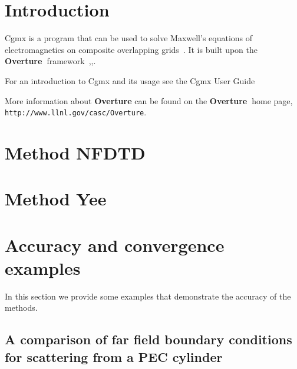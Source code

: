 \documentclass{article}
\newcommand{\Overture}{{\bf Overture\ }}
\begin{document}
\clearpage
\tableofcontents


\vfill\eject

\section{Introduction}

   Cgmx is a program that can be used to solve Maxwell's equations of electromagnetics 
on composite overlapping grids~\cite{max2006b}. It is built upon
the \Overture framework~\cite{Brown97},\cite{Henshaw96a},\cite{iscope97}.

For an introduction to Cgmx and its usage see the Cgmx User Guide~\cite{CgmxUserGuide}

More information about
{\bf Overture} can be found on the \Overture home page, {\tt http://www.llnl.gov/\-casc/\-Overture}.

\clearpage
\section{Method NFDTD} \label{sec:nfdtd}


\clearpage
\section{Method Yee} \label{sec:nfdtd}



\clearpage
\section{Accuracy and convergence examples} \label{sec:examples}

In this section we provide some examples that demonstrate the accuracy of the methods.

\clearpage
\subsection{A comparison of far field boundary conditions for scattering from a PEC cylinder}
\end{document}
